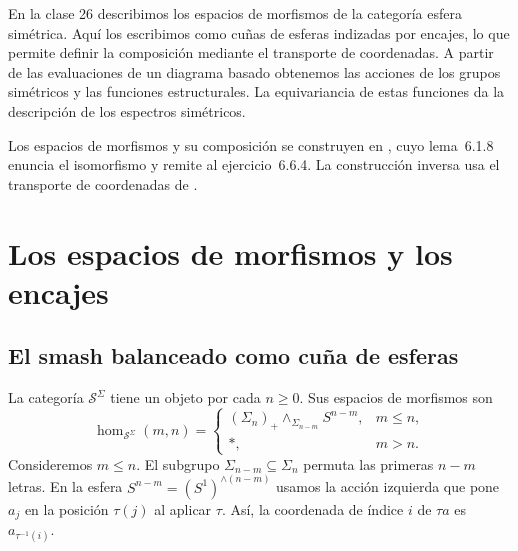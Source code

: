 
En la clase 26 describimos los espacios de morfismos de la categoría esfera simétrica. Aquí los escribimos como cuñas de esferas indizadas por encajes, lo que permite definir la composición mediante el transporte de coordenadas. A partir de las evaluaciones de un diagrama basado obtenemos las acciones de los grupos simétricos y las funciones estructurales. La equivariancia de estas funciones da la descripción de los espectros simétricos.

Los espacios de morfismos y su composición se construyen en \cite[definición~6.1.6 y ecuación~(6.1.7)]{malkiewich}, cuyo lema~6.1.8 enuncia el isomorfismo y remite al ejercicio~6.6.4. La construcción inversa usa el transporte de coordenadas de \cite[§~1.2, definición~1.9]{hausmann2019}.

\section{Los espacios de morfismos y los encajes}

\subsection{El smash balanceado como cuña de esferas}

La categoría $\mathcal S^\Sigma$ tiene un objeto por cada $n\geq 0$. Sus espacios de morfismos son
\[
\hom_{\mathcal S^\Sigma}(m,n)=
\begin{cases}
(\Sigma_n)_+\wedge_{\Sigma_{n-m}}S^{n-m},&m\leq n,\\
*,&m>n.
\end{cases}
\]
Consideremos $m\leq n$. El subgrupo $\Sigma_{n-m}\subseteq\Sigma_n$ permuta las primeras $n-m$ letras. En la esfera $S^{n-m}=(S^1)^{\wedge(n-m)}$ usamos la acción izquierda que pone $a_j$ en la posición $\tau(j)$ al aplicar $\tau$. Así, la coordenada de índice $i$ de $\tau a$ es $a_{\tau^{-1}(i)}$.

